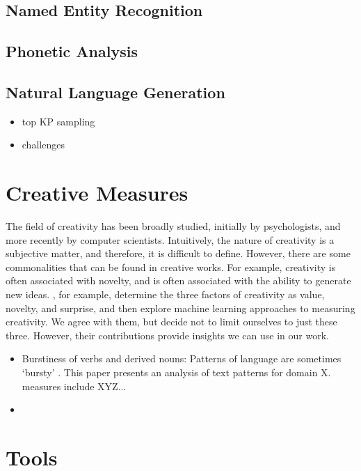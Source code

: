 \subsection{Named Entity Recognition}

\subsection{Phonetic Analysis}

\subsection{Natural Language Generation}
\begin{itemize}
    \item top KP sampling
    \item challenges 
\end{itemize}


\section{Creative Measures}
The field of creativity has been broadly studied, initially by psychologists, and more recently by computer scientists. 
Intuitively, the nature of creativity is a subjective matter, and therefore, it is difficult to define. However, there are some commonalities that can be found in creative works. For example, creativity is often associated with novelty, and is often associated with the ability to generate new ideas. \cite{franceschelli_deepcreativity_2022}, for example, determine the three factors of creativity as value, novelty, and surprise, and then explore machine learning approaches to measuring creativity. We agree with them, but decide not to limit ourselves to just these three. However, their contributions provide insights we can use in our work.  
\begin{itemize}
    \item Burstiness of verbs and derived nouns: Patterns of language are sometimes `bursty' \cite{pierrehumbert_burstiness_2012}. This paper presents an analysis of text patterns for domain X. measures include XYZ...
    \item 
\end{itemize}

\section{Tools}
